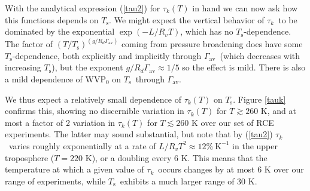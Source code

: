 \documentclass[10pt]{article}
\newcommand{\eqnref}[1]{(\ref{#1})}
\newcommand{\inverse}{^{-1}}
\newcommand{\der}[2]{\ensuremath{\frac{d #1}{d #2}}}
\newcommand{\tauk}{\ensuremath{\tau_k}}
\newcommand{\Ts}{\ensuremath{T_\mathrm{s}}}
\newcommand{\WVP}{\ensuremath{\mathrm{WVP}}}
\newcommand{\Ttp}{\ensuremath{T_\mathrm{tp}}}
\newcommand{\gammaav}{\ensuremath{\Gamma_\mathrm{av}}}
\newcommand{\Kinverse}{\ensuremath{\mathrm{K^{-1}}}}
\begin{document}

With the analytical expression \eqnref{tau2} for $\tauk(T)$ in hand we can now ask how this functions depends on \Ts. We might expect the vertical behavior of \tauk\ to be dominated by the exponential $\exp(-L/R_vT)$, which has no \Ts-dependence. The factor of
$(T/\Ts)^{(g/R_d\gammaav)}$ coming from pressure broadening does have some \Ts-dependence, both explicitly and implicitly through \gammaav\ (which decreases with increasing \Ts), but the exponent $g/R_d \gammaav \approx 1/5$ so the effect is mild. There is also a mild dependence of  $\WVP_0$ on \Ts\ through \gammaav. 

We thus expect a relatively small dependence of $\tauk(T)$ on \Ts. Figure \ref{tauk} confirms this, showing no discernible variation in $\tauk(T)$ for $T \gtrsim 260 $ K, and at most a factor of 2 variation in $\tauk(T)$ for $T \lesssim 260$ K over our set of RCE experiments. The latter may sound substantial, but note that by \eqnref{tau2} \tauk\ varies roughly exponentially at a rate of $L/R_vT^2 \approx  12\%\ \Kinverse$ in the upper troposphere ($T=220$ K), or a doubling every 6 K. This means that the temperature at which a given value of  \tauk\ occurs changes by at most 6 K over our range of experiments, while \Ts\ exhibits a much larger range of  30 K.


\end{document}
